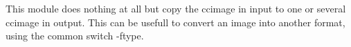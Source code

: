 This module does nothing at all but copy the ccimage in input
to one or several ccimage in output.
This can be usefull to convert an image into another format,
using the common switch -ftype.

